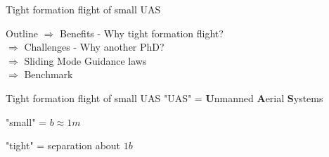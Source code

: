 \documentclass[12pt,svgnames,table,draft=false]{beamer}
\begin{document}
\begin{frame}
\vspace{-8em}
\centering
\huge{Tight formation flight of small UAS}
\end{frame}

\usebackgroundtemplate{}

\begin{frame}{Outline}
  $\Rightarrow$ Benefits - Why tight formation flight?\\
  \vspace{1em}
  $\Rightarrow$ Challenges - Why another PhD? \\
  \vspace{1em}
  $\Rightarrow$ Sliding Mode Guidance laws \\
  \vspace{1em}
    $\Rightarrow$ Benchmark \\
\end{frame}

\begin{frame}{Tight formation flight of small UAS}
	\centering
	\Large
	"UAS" = \textbf{U}nmanned \textbf{A}erial \textbf{S}ystems \\
	
	\hspace{3em}
	
	"small" = $b \approx 1m$
	
	\hspace{3em}
		
	"tight" = separation about $1b$
		
\end{frame}
\end{document}
